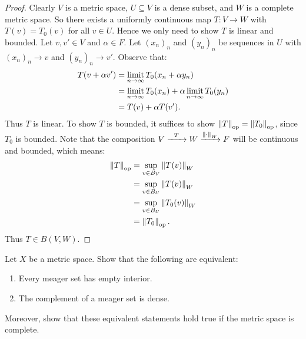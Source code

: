 \documentclass[11pt,twoside,openany]{memoir}
\begin{document}
        \begin{proof}
            Clearly $V$ is a metric space, $U\subseteq V$ is a dense subset, and $W$ is a complete metric space. So there exists a uniformly continuous map $T:V \rightarrow W$ with $T(v) = T_0(v)$ for all $v \in U$. Hence we only need to show $T$ is linear and bounded. Let $v,v' \in V$ and $\alpha \in F$. Let $(x_n)_n$ and $(y_n)_n$ be sequences in $U$ with $(x_n)_n \rightarrow v$ and $(y_n)_n \rightarrow v'$. Observe that:
                \begin{equation*}
                \begin{split}
                    T(v + \alpha v')
                    & = \limit_{n \rightarrow \infty} T_0(x_n + \alpha y_n) \\
                    & = \limit_{n \rightarrow \infty} T_0(x_n) + \alpha \limit_{n \rightarrow \infty} T_0(y_n) \\
                    & = T(v) + \alpha T(v').
                \end{split}
                \end{equation*}
            Thus $T$ is linear. To show $T$ is bounded, it suffices to show $\lnorm T \rnorm_{\op} = \lnorm T_0 \rnorm_{\op}$, since $T_0$ is bounded. Note that the composition $V \xrightarrow{\h6T\h6} W \xrightarrow{\lnorm \cdot \rnorm_W} F$ will be continuous and bounded, which means:
                \begin{equation*}
                \begin{split}
                   \lnorm T \rnorm_{\op} 
                   & = \sup_{v \in B_V}\lnorm T(v) \rnorm_W \\
                   & = \sup_{v \in B_U}\lnorm T(v) \rnorm_W \\
                   & = \sup_{v \in B_U}\lnorm T_0(v) \rnorm_W \\
                   & = \lnorm T_0 \rnorm_{\op}.
                \end{split}
                \end{equation*}
            Thus $T \in B(V,W)$.
        \end{proof}
    \begin{exercise}
        Let $X$ be a metric space. Show that the following are equivalent:
            \begin{enumerate}[label = (\arabic*),itemsep=1pt,topsep=3pt]
                \item Every meager set has empty interior.
                \item The complement of a meager set is dense.
            \end{enumerate}
        Moreover, show that these equivalent statements hold true if the metric space is complete.
    \end{exercise}
\end{document}
